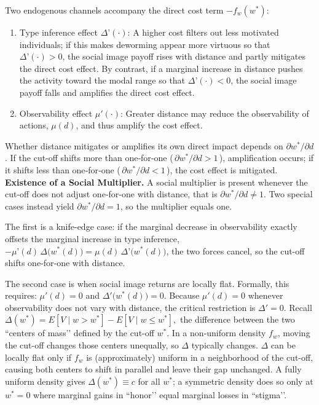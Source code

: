 \documentclass[12pt,a4paper]{article}
\begin{document}
Two endogenous channels accompany the direct cost term $-f_w(w^{\ast})$:

\begin{enumerate}
\item Type inference effect $\Delta’(\cdot)$: A higher cost filters out less motivated individuals; if this makes deworming appear more virtuous so that $\Delta’(\cdot)>0$, the social image payoff rises with distance and partly mitigates the direct cost effect.  By contrast, if a marginal increase in distance pushes the activity toward the modal range so that $\Delta’(\cdot)<0$, the social image payoff falls and amplifies the direct cost effect.

\item Observability effect $\mu'(\cdot)$: Greater distance may reduce the observability of actions, $\mu(d)$, and thus amplify the cost effect.
 
\end{enumerate}

Whether distance mitigates or amplifies its own direct impact depends on $\partial w^{\ast}/\partial d$.  If the cut-off shifts more than one‑for‑one (\,$\partial w^{\ast}/\partial d>1$\,), amplification occurs; if it shifts less than one‑for‑one (\,$\partial w^{\ast}/\partial d<1$\,), the cost effect is mitigated. \\


\textbf{Existence of a Social Multiplier.} A social multiplier is present whenever the cut-off does not adjust one‑for‑one with distance, that is \(\partial w^{\ast}/\partial d \neq 1\).  Two special cases instead yield \(\partial w^{\ast}/\partial d = 1\), so the multiplier equals one. 

The first is a knife-edge case: if the marginal decrease in observability exactly offsets the marginal increase in type inference, $-\mu’(d)\,\Delta\bigl(w^{\ast}(d)\bigr)=\mu(d)\,\Delta’\bigl(w^{\ast}(d)\bigr)$, the two forces cancel, so the cut-off shifts one‑for‑one with distance.

The second case is when social image returns are locally flat. Formally, this requires:  
$\mu'(d)=0$ and $\Delta'\!\bigl(w^{\ast}(d)\bigr)=0$. Because $\mu'(d)=0$ whenever observability does not vary with distance, the critical restriction is $\Delta'=0$.  Recall $\Delta(w^{\ast}) = E[V \mid w>w^{\ast}] - E[V \mid w\le w^{\ast}],$ the difference between the two “centers of mass’’ defined by the cut-off $w^{\ast}$.  In a non‑uniform density $f_w$, moving the cut-off changes those centers unequally, so $\Delta$ typically changes. $\Delta$ can be locally flat only if $f_w$ is (approximately) uniform in a neighborhood of the cut-off, causing both centers to shift in parallel and leave their gap unchanged.  A fully uniform density gives $\Delta(w^{\ast})\equiv c$ for all $w^{\ast}$; a symmetric density does so only at $w^{\ast}=0$ where marginal gains in “honor’’ equal marginal losses in “stigma’’.
\end{document}
